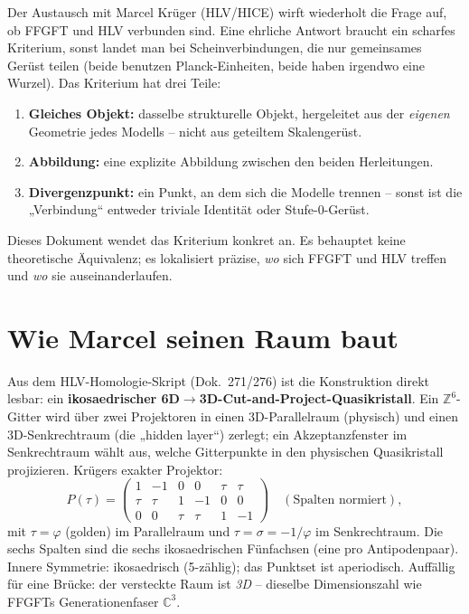 Der Austausch mit Marcel Krüger (HLV/HICE) wirft wiederholt die Frage auf, ob
FFGFT und HLV verbunden sind. Eine ehrliche Antwort braucht ein scharfes Kriterium,
sonst landet man bei Scheinverbindungen, die nur gemeinsames Gerüst teilen
(beide benutzen Planck-Einheiten, beide haben irgendwo eine Wurzel). Das
Kriterium hat drei Teile:
\begin{enumerate}
\item \textbf{Gleiches Objekt:} dasselbe strukturelle Objekt, hergeleitet aus der
      \emph{eigenen} Geometrie jedes Modells -- nicht aus geteiltem Skalengerüst.
\item \textbf{Abbildung:} eine explizite Abbildung zwischen den beiden Herleitungen.
\item \textbf{Divergenzpunkt:} ein Punkt, an dem sich die Modelle trennen --
      sonst ist die „Verbindung`` entweder triviale Identität oder Stufe-0-Gerüst.
\end{enumerate}
Dieses Dokument wendet das Kriterium konkret an. Es behauptet keine theoretische
Äquivalenz; es lokalisiert präzise, \emph{wo} sich FFGFT und HLV treffen und
\emph{wo} sie auseinanderlaufen.

\section{Wie Marcel seinen Raum baut}

Aus dem HLV-Homologie-Skript (Dok.~271/276) ist die Konstruktion direkt lesbar:
ein \textbf{ikosaedrischer 6D$\to$3D-Cut-and-Project-Quasikristall}. Ein
$\mathbb{Z}^6$-Gitter wird über zwei Projektoren in einen 3D-Parallelraum
(physisch) und einen 3D-Senkrechtraum (die „hidden layer``) zerlegt; ein
Akzeptanzfenster im Senkrechtraum wählt aus, welche Gitterpunkte in den physischen
Quasikristall projizieren. Krügers exakter Projektor:
\[
P(\tau)=\begin{pmatrix}
1 & -1 & 0 & 0 & \tau & \tau\\
\tau & \tau & 1 & -1 & 0 & 0\\
0 & 0 & \tau & \tau & 1 & -1
\end{pmatrix}\quad(\text{Spalten normiert}),
\]
mit $\tau=\varphi$ (golden) im Parallelraum und $\tau=\sigma=-1/\varphi$ im
Senkrechtraum. Die sechs Spalten sind die sechs ikosaedrischen Fünfachsen (eine
pro Antipodenpaar). Innere Symmetrie: ikosaedrisch (5-zählig); das Punktset ist
aperiodisch. Auffällig für eine Brücke: der versteckte Raum ist \emph{3D} --
dieselbe Dimensionszahl wie FFGFTs Generationenfaser $\mathbb{C}^3$.

